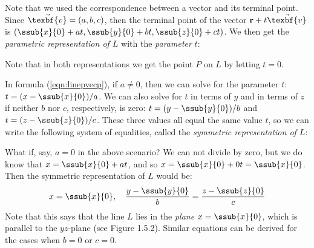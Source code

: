 \vspace{1mm}
Note that we used the correspondence between a vector and its terminal point. Since $\vec{\texbf{v}} = (a,b,c)$, then the
terminal point of the vector $\textbf{r} + t \vec{\texbf{v}}$ is $(\ssub{x}{0} + at,\ssub{y}{0} + bt,\ssub{z}{0} + ct)$. We
then get the \emph{parametric representation of $L$} with the
\emph{parameter} $t$:\vspace{1mm}

Note that in both representations we get the point $P$ on $L$ by letting $t = 0$.

In formula (\ref{eqn:linepvecp}), if $a \ne 0$, then we can solve for the parameter $t$: $t = (x - \ssub{x}{0})/a$.
We can also solve for $t$ in terms of $y$ and in terms of $z$ if neither $b$ nor $c$, respectively, is zero:
$t = (y - \ssub{y}{0})/b$ and $t = (z - \ssub{z}{0})/c$. These three values all equal the same value $t$,
so we can write the following system of equalities, called the \emph{symmetric representation of $L$}:\vspace{1mm}

\vspace{1mm}
\piccaption[]{}
What if, say, $a = 0$ in the above scenario? We can not divide by zero, but we do know that $x = \ssub{x}{0} + at$, and
so $x = \ssub{x}{0} + 0t = \ssub{x}{0}$. Then the symmetric representation of $L$
would be:
\begin{equation}\label{eqn:linepvecsa}
 x = \ssub{x}{0}, \quad \frac{y - \ssub{y}{0}}{b} = \frac{z - \ssub{z}{0}}{c}
\end{equation}
Note that this says that the line $L$ lies in the \emph{plane} $x = \ssub{x}{0}$, which is parallel to the $yz$-plane
(see Figure 1.5.2). Similar equations can be derived for the cases when $b = 0$ or $c = 0$.

